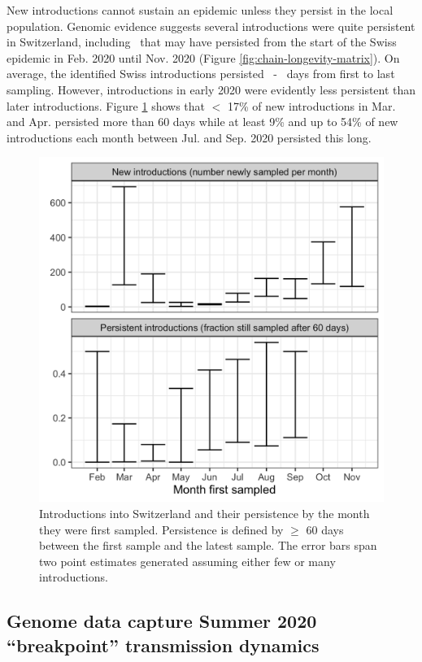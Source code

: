 \documentclass[9pt,twoside,lineno]{pnas-new} %
\begin{document}
New introductions cannot sustain an epidemic unless they persist in the local population. Genomic evidence suggests several introductions were quite persistent in Switzerland, including \nspanningchainsfebnovmin\ that may have persisted from the start of the Swiss epidemic in Feb. 2020 until Nov. 2020 (Figure \ref{fig:chain-longevity-matrix}). On average, the identified Swiss introductions persisted \meantimetolastsamplemax\ - \meantimetolastsamplemin\ days from first to last sampling. However, introductions in early 2020 were evidently less persistent than later introductions. Figure \ref{fig:chain-longevity} shows that $<$ 17\% of new introductions in Mar. and Apr. persisted more than 60 days while at least 9\% and up to 54\% of new introductions each month between Jul. and Sep. 2020 persisted this long.


\begin{figure}[H]
\centering
\includegraphics[width=.4\linewidth]{figures/introductions_and_persistance.png}
\caption{Introductions into Switzerland and their persistence by the month they were first sampled. Persistence is defined by $\geq$ 60 days between the first sample and the latest sample. The error bars span two point estimates generated assuming either few or many introductions.}
\label{fig:chain-longevity}
\end{figure}

\subsection{Genome data capture Summer 2020 ``breakpoint'' transmission dynamics}
\end{document}
